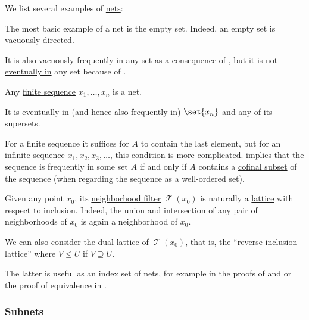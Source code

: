 \begin{example}\label{ex:def:topological_net}
  We list several examples of \hyperref[def:topological_net]{nets}:
  \begin{thmenum}
     The most basic example of a net is the empty set. Indeed, an empty set is vacuously directed.

    It is also vacuously \hyperref[def:net_frequently_in]{frequently in} any set as a consequence of , but it is not \hyperref[def:net_eventually_in]{eventually in} any set because of .

     Any \hyperref[def:sequence]{finite sequence} \( x_1, \ldots, x_n \) is a net.

    It is eventually in (and hence also frequently in) \( \set{ x_n } \) and any of its supersets.

     For a finite sequence it suffices for \( A \) to contain the last element, but for an infinite sequence \( x_1, x_2, x_3, \ldots \), this condition is more complicated.  implies that the sequence is frequently in some set \( A \) if and only if \( A \) contains a \hyperref[def:cofinal_set]{cofinal subset} of the sequence (when regarding the sequence as a well-ordered set).

     Given any point \( x_0 \), its \hyperref[def:neighborhood_system]{neighborhood filter} \( \mscrT(x_0) \) is naturally a \hyperref[def:semilattice/lattice]{lattice} with respect to inclusion. Indeed, the union and intersection of any pair of neighborhoods of \( x_0 \) is again a neighborhood of \( x_0 \).

    We can also consider the \hyperref[def:semilattice/duality]{dual lattice} of \( \mscrT(x_0) \), that is, the \enquote{reverse inclusion lattice} where \( V \leq U \) if \( V \supseteq U \).

    The latter is useful as an index set of nets, for example in the proofs of  and  or the proof of equivalence in .
  \end{thmenum}
\end{example}

\subsubsection{Subnets}

